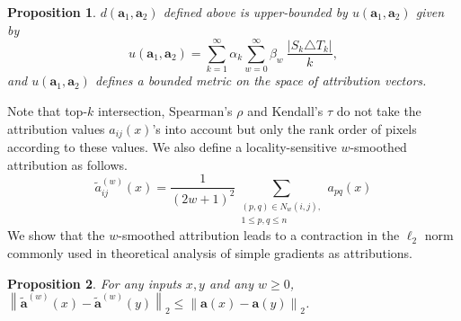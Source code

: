 \documentclass[letterpaper]{article} %
\newtheorem{prop}{Proposition}
\def\ba{\mathbf{a}}
\newcommand{\norm}[1]{\left\|#1\right\|}
\newcommand{\size}[1]{\left|#1\right|}
\begin{document}
\begin{prop} \label{prop:metric}
$d(\ba_{1}, \ba_{2})$ defined above is upper-bounded by $u(\ba_{1}, \ba_{2})$ given by
\[
u(\ba_{1}, \ba_{2}) = \sum_{k=1}^{\infty} \alpha_{k} \sum_{w=0}^{\infty} \beta_{w}~ \frac{\size{S_{k} \triangle T_{k}}}{k},
\]
and $u(\ba_{1}, \ba_{2})$ defines a bounded metric on the space of attribution vectors.
\end{prop}
Note that top-$k$ intersection, Spearman's $\rho$ and Kendall's $\tau$ do not take the attribution values $a_{ij}(x)$'s into account but only the rank order of pixels according to these values. We also define a locality-sensitive $w$-smoothed attribution as follows.
\[
\tilde{a}_{ij}^{(w)}(x) = \frac{1}{(2w+1)^{2}} \sum_{\substack{(p, q) \in N_{w}(i, j), \\ 1 \leq p, q \leq n}} a_{pq}(x)
\]
We show that the $w$-smoothed attribution leads to a contraction in the $\ell_{2}$ norm commonly used in theoretical analysis of simple gradients as attributions. 
\begin{prop} \label{prop:w-smoothed}
For any inputs $x, y$ and any $w \geq 0$, $\norm{\tilde{\ba}^{(w)}(x) - \tilde{\ba}^{(w)}(y)}_{2} \leq \norm{\ba(x) - \ba(y)}_{2}$.
\end{prop}
\end{document}
